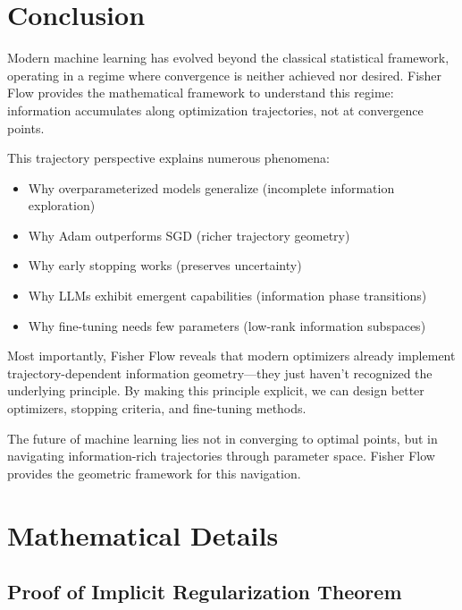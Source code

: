 \documentclass[11pt]{article}
\begin{document}
\section{Conclusion}

Modern machine learning has evolved beyond the classical statistical framework, operating in a regime where convergence is neither achieved nor desired. Fisher Flow provides the mathematical framework to understand this regime: information accumulates along optimization trajectories, not at convergence points.

This trajectory perspective explains numerous phenomena:
\begin{itemize}
\item Why overparameterized models generalize (incomplete information exploration)
\item Why Adam outperforms SGD (richer trajectory geometry)
\item Why early stopping works (preserves uncertainty)
\item Why LLMs exhibit emergent capabilities (information phase transitions)
\item Why fine-tuning needs few parameters (low-rank information subspaces)
\end{itemize}

Most importantly, Fisher Flow reveals that modern optimizers already implement trajectory-dependent information geometry—they just haven't recognized the underlying principle. By making this principle explicit, we can design better optimizers, stopping criteria, and fine-tuning methods.

The future of machine learning lies not in converging to optimal points, but in navigating information-rich trajectories through parameter space. Fisher Flow provides the geometric framework for this navigation.

\appendix

\section{Mathematical Details}

\subsection{Proof of Implicit Regularization Theorem}
\end{document}
